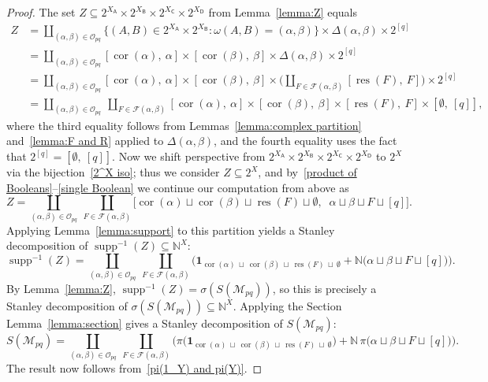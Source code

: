 \documentclass[noamsfonts,10pt]{amsart}
\newcommand{\N}{\mathbb{N}}
\newcommand{\M}{\mathcal{M}}
\newcommand{\al}{\alpha}
\newcommand{\be}{\beta}
\renewcommand{\O}{\mathcal{O}}
\newcommand{\F}{\mathcal{F}}
\newcommand{\res}{\operatorname{res}}
\DeclareMathOperator{\cor}{cor}
\newcommand{\sA}{\mathsf{A}}
\newcommand{\sB}{\mathsf{B}}
\newcommand{\sC}{\mathsf{C}}
\newcommand{\sD}{\mathsf{D}}
\newcommand{\1}{\mathbf{1}}
\theoremstyle{plain}
\theoremstyle{definition}
\numberwithin{equation}{section}
\begin{document}
\begin{proof}

The set $Z \subseteq 2^{X_{\sA}} \times 2^{X_{\sB}} \times 2^{X_{\sC}} \times 2^{X_{\sD}}$ from Lemma~\ref{lemma:Z} equals
    \begin{align*}
        Z &= \coprod_{(\al, \be) \in \O_{pq}} \Big\{ (A,B) \in 2^{X_{\sA}} \times 2^{X_{\sB}} : \omega(A,B) = (\al, \be) \Big\} \times \Delta(\al, \be) \times 2^{[q]} \\
        &= \coprod_{(\al, \be) \in \O_{pq}} [ \cor(\al), \: \al] \times [ \cor(\be), \: \be] \times \Delta(\al, \be) \times 2^{[q]} \\
        &= \coprod_{(\al, \be) \in \O_{pq}} [ \cor(\al), \: \al] \times [ \cor(\be), \: \be] \times \Bigg( \coprod_{F \in \F(\al,\be)} [ \res(F), \: F] \Bigg) \times 2^{[q]} \\
        & = \coprod_{(\al,\be) \in \O_{pq}}\ \coprod_{F \in \F(\al,\be)}
        [\cor(\al), \: \al] \times [\cor(\be), \: \be]\times [\res(F), \: F] \times [\emptyset, \: [q]],
    \end{align*}
where the third equality follows from Lemmas~\ref{lemma:complex partition} and~\ref{lemma:F and R} applied to $\Delta(\al, \be)$, and the fourth equality uses the fact that $2^{[q]} = [\emptyset, \: [q]]$.
Now we shift perspective from $2^{X_{\sA}} \times 2^{X_{\sB}} \times 2^{X_{\sC}} \times 2^{X_{\sD}}$ to $2^X$ via the bijection~\eqref{2^X iso};
thus we consider $Z \subseteq 2^X$, and by~\eqref{product of Booleans}--\eqref{single Boolean} we continue our computation from above as
    \[
        Z =
        \coprod_{(\al,\be)\in\O_{pq}}\ \coprod_{F\in\F(\al,\be)}   \big[\cor(\al)\sqcup\cor(\be)\sqcup\res(F)\sqcup\emptyset, \;\;
        \al\sqcup\be\sqcup F\sqcup[q]\big].
    \]
    Applying Lemma~\ref{lemma:support} to this partition yields a Stanley decomposition of $\operatorname{supp}^{-1}(Z)\subseteq\N^X$:
    \[
        \operatorname{supp}^{-1}(Z) = \coprod_{(\al,\be)\in\O_{pq}}\ \coprod_{F\in\F(\al,\be)}
        \Big(\1_{\cor(\al) \: \sqcup \: \cor(\be) \: \sqcup \: \res(F) \: \sqcup \: \emptyset} + \N\big(\al\sqcup\be\sqcup F\sqcup[q]\big)\Big).
    \]
    By Lemma~\ref{lemma:Z}, $\operatorname{supp}^{-1}(Z)=\sigma(S(\M_{pq}))$, so this is precisely a Stanley decomposition of $\sigma(S(\M_{pq}))\subseteq\N^X$. 
    Applying the Section Lemma~\ref{lemma:section} gives a Stanley decomposition of $S(\M_{pq})$:
    \[
        S(\M_{pq}) = \coprod_{(\al,\be)\in\O_{pq}}\ \coprod_{F\in\F(\al,\be)}
        \Big(\pi\big(\1_{\cor(\al) \: \sqcup \: \cor(\be) \: \sqcup \: \res(F) \: \sqcup \: \emptyset}\big)
        + \N\,\pi\big(\al\sqcup\be\sqcup F\sqcup[q]\big)\Big).
    \]
    The result now follows from~\eqref{pi(1_Y) and pi(Y)}.
\end{proof}
\end{document}
